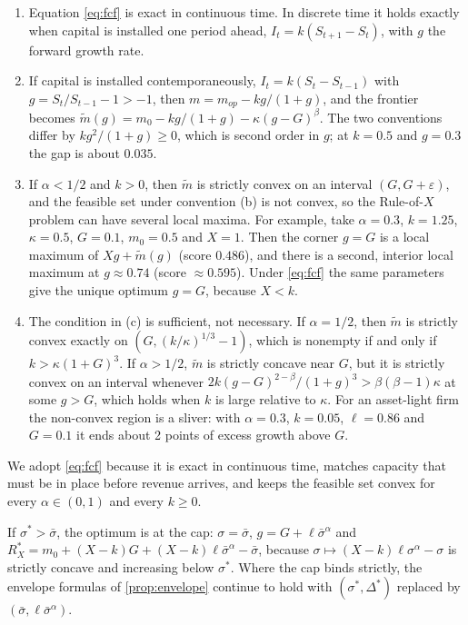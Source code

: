 \begin{lemma}\label{lem:timing}
\begin{enumerate}
\item[(a)] Equation \eqref{eq:fcf} is exact in continuous time. In discrete time it holds exactly when capital is installed one period ahead, $I_t=k(S_{t+1}-S_t)$, with $g$ the forward growth rate.
\item[(b)] If capital is installed contemporaneously, $I_t=k(S_t-S_{t-1})$ with $g=S_t/S_{t-1}-1>-1$, then $m=m_{op}-kg/(1+g)$, and the frontier becomes $\tilde m(g)=m_0-kg/(1+g)-\kappa(g-G)^{\beta}$. The two conventions differ by $kg^2/(1+g)\ge 0$, which is second order in $g$; at $k=0.5$ and $g=0.3$ the gap is about $0.035$.
\item[(c)] If $\alpha<1/2$ and $k>0$, then $\tilde m$ is strictly convex on an interval $(G,G+\varepsilon)$, and the feasible set under convention (b) is not convex, so the Rule-of-$X$ problem can have several local maxima. For example, take $\alpha=0.3$, $k=1.25$, $\kappa=0.5$, $G=0.1$, $m_0=0.5$ and $X=1$. Then the corner $g=G$ is a local maximum of $Xg+\tilde m(g)$ (score $0.486$), and there is a second, interior local maximum at $g\approx 0.74$ (score $\approx 0.595$). Under \eqref{eq:fcf} the same parameters give the unique optimum $g=G$, because $X<k$.
\item[(d)] The condition in (c) is sufficient, not necessary. If $\alpha=1/2$, then $\tilde m$ is strictly convex exactly on $(G,(k/\kappa)^{1/3}-1)$, which is nonempty if and only if $k>\kappa(1+G)^3$. If $\alpha>1/2$, $\tilde m$ is strictly concave near $G$, but it is strictly convex on an interval whenever $2k(g-G)^{2-\beta}/(1+g)^3>\beta(\beta-1)\kappa$ at some $g>G$, which holds when $k$ is large relative to $\kappa$. For an asset-light firm the non-convex region is a sliver: with $\alpha=0.3$, $k=0.05$, $\ell=0.86$ and $G=0.1$ it ends about 2 points of excess growth above $G$.
\end{enumerate}
\end{lemma}

We adopt \eqref{eq:fcf} because it is exact in continuous time, matches capacity that must be in place before revenue arrives, and keeps the feasible set convex for every $\alpha\in(0,1)$ and every $k\ge0$.

\begin{remark}\label{rem:cap}
If $\sigma^*>\bar\sigma$, the optimum is at the cap: $\sigma=\bar\sigma$, $g=G+\ell\bar\sigma^{\alpha}$ and $R_X^*=m_0+(X-k)G+(X-k)\ell\bar\sigma^{\alpha}-\bar\sigma$, because $\sigma\mapsto(X-k)\ell\sigma^{\alpha}-\sigma$ is strictly concave and increasing below $\sigma^*$. Where the cap binds strictly, the envelope formulas of \autoref{prop:envelope} continue to hold with $(\sigma^*,\Delta^*)$ replaced by $(\bar\sigma,\ell\bar\sigma^{\alpha})$.
\end{remark}

